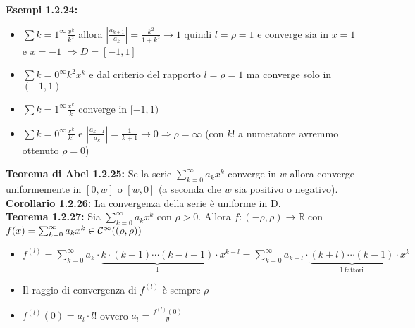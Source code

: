 \documentclass[a4paper,11pt,titlepage]{book}
\begin{document}
\textbf{Esempi 1.2.24:} \begin{itemize}
\item $\sum{k=1}^{\infty}\frac{x^k}{k^2}$ allora $\left|\frac{a_{k+1}}{a_k}\right|=\frac{k^2}{1+k^2}\to 1$ quindi $l=\rho=1$ e converge sia in $x=1$ e $x=-1$ $\Rightarrow D=[-1,1]$
\item $\sum{k=0}^{\infty} k^2x^k$ e dal criterio del rapporto $l=\rho=1$ ma converge solo in $(-1,1)$
\item $\sum{k=1}^{\infty}\frac{x^k}{k}$ converge in $[-1,1)$
\item $\sum{k=0}^{\infty}\frac{x^k}{k!}$  e $\left | \frac{a_{k+1}}{a_k}\right|=\frac{1}{k+1}\to 0\Rightarrow\rho = \infty$ (con $k!$ a numeratore avremmo ottenuto $\rho=0$)\\
\end{itemize}

\textbf{Teorema di Abel 1.2.25:} Se la serie $\sum_{k=0}^{\infty}a_k x^k$ converge in $w$ allora converge uniformemente in $[0,w]$ o $[w,0]$ (a seconda che $w$ sia positivo o negativo).\\

\textbf{Corollario 1.2.26:} La convergenza della serie è uniforme in D.\\

\textbf{Teorema 1.2.27:} Sia $\sum_{k=0}^\infty a_kx^k$ con $\rho >0$. Allora $f:(-\rho,\rho)\to\mathbb{R}$ con $f(x)=\sum_{k=0}^\infty a_kx^k\in\mathcal{C}^\infty((\-\rho,\rho))$\begin{itemize}
\item $f^{(l)}=\sum_{k=0}^\infty a_k\cdot\underbrace{k \cdot (k-1) \cdots (k-l+1)}_{\mbox{l}}\cdot x^{k-l}=\sum_{k=0}^\infty a_{k+l}\cdot\underbrace{ (k+l) \cdots (k-1)}_{\mbox{l fattori}}\cdot x^{k}$
\item Il raggio di convergenza di $f^{(l)}$ è sempre $\rho$
\item $f^{(l)}(0)=a_l\cdot l!$ ovvero $a_l=\frac{f^{(l)}(0)}{l!}$\\
\end{itemize}
\end{document}
